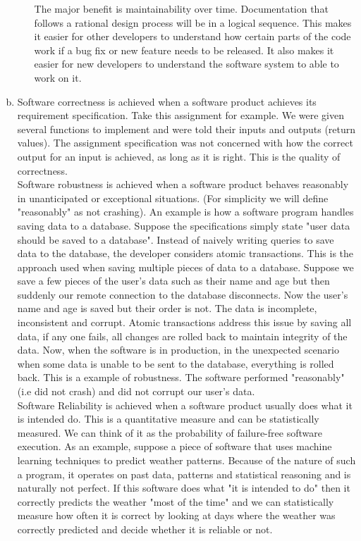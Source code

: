 \documentclass[12pt]{article}
\begin{document}
\begin{enumerate}[(a)]
\begin{itemize}[(a)]
The major benefit is maintainability over time. Documentation that follows a rational design process will be in a logical sequence. This makes it easier for other developers to understand how certain parts of the code work if a bug fix or new feature needs to be released. It also makes it easier for new developers to understand the software system to able to work on it.
\end{itemize}

\item Software correctness is achieved when a software product achieves its requirement specification. Take this assignment for example. We were given several functions to implement and were told their inputs and outputs (return values). The assignment specification was not concerned with how the correct output for an input is achieved, as long as it is right. This is the quality of correctness.\\

Software robustness is achieved when a software product behaves reasonably in unanticipated or exceptional situations. (For simplicity we will define "reasonably" as not crashing). An example is how a software program handles saving data to a database. Suppose the specifications simply state "user data should be saved to a database". Instead of naively writing queries to save data to the database, the developer considers atomic transactions. This is the approach used when saving multiple pieces of data to a database. Suppose we save a few pieces of the user's data such as their name and age but then suddenly our remote connection to the database disconnects. Now the user's name and age is saved but their order is not. The data is incomplete, inconsistent and corrupt. Atomic transactions address this issue by saving all data, if any one fails, all changes are rolled back to maintain integrity of the data. Now, when the software is in production, in the unexpected scenario when some data is unable to be sent to the database, everything is rolled back. This is a example of robustness. The software performed "reasonably" (i.e did not crash) and did not corrupt our user's data.\\

Software Reliability is achieved when a software product usually does what it is intended do. This is a quantitative measure and can be statistically measured. We can think of it as the probability of failure-free software execution. As an example, suppose a piece of software that uses machine learning techniques to predict weather patterns. Because of the nature of such a program, it operates on past data, patterns and statistical reasoning and is naturally not perfect. If this software does what "it is intended to do" then it correctly predicts the weather "most of the time" and we can statistically measure how often it is correct by looking at days where the weather was correctly predicted and decide whether it is reliable or not.


\end{enumerate}
\end{document}
